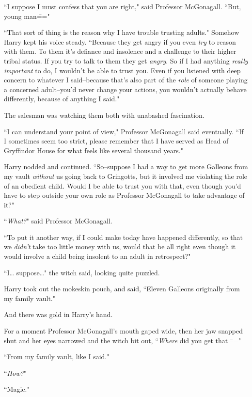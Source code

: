 ``I suppose I must confess that you are right," said Professor McGonagall. ``But, young man\==="

``That sort of thing is the reason why I have trouble trusting adults." Somehow Harry kept his voice steady. ``Because they get angry if you even \emph{try} to reason with them. To them it's defiance and insolence and a challenge to their higher tribal status. If you try to talk to them they get \emph{angry}. So if I had anything \emph{really important} to do, I wouldn't be able to trust you. Even if you listened with deep concern to whatever I said\---because that's also part of the \emph{role} of someone playing a concerned adult\---you'd never change your actions, you wouldn't actually behave differently, because of anything I said."

The salesman was watching them both with unabashed fascination.

``I can understand your point of view," Professor McGonagall said eventually. ``If I sometimes seem too strict, please remember that I have served as Head of Gryffindor House for what feels like several thousand years."

Harry nodded and continued. ``So\---suppose I had a way to get more Galleons from my vault \emph{without} us going back to Gringotts, but it involved me violating the role of an obedient child. Would I be able to trust you with that, even though you'd have to step outside your own role as Professor McGonagall to take advantage of it?"

``\emph{What?}" said Professor McGonagall.

``To put it another way, if I could make today have happened differently, so that we \emph{didn't} take too little money with us, would that be all right even though it would involve a child being insolent to an adult in retrospect?"

``I{\ldots} suppose{\ldots}" the witch said, looking quite puzzled.

Harry took out the mokeskin pouch, and said, ``Eleven Galleons originally from my family vault."

And there was gold in Harry's hand.

For a moment Professor McGonagall's mouth gaped wide, then her jaw snapped shut and her eyes narrowed and the witch bit out, ``\emph{Where} did you get that\==="

``From my family vault, like I said."

``\emph{How?}"

``Magic."

